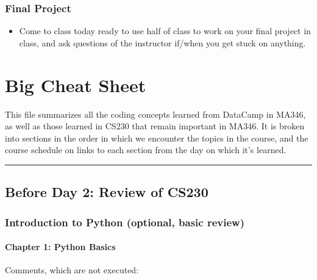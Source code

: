 \documentclass[letterpaper,10pt,english]{jupyterBook}
\begin{document}
\subsection{Final Project}
\label{\detokenize{course-schedule:final-project}}\begin{itemize}
\item {} 
\sphinxAtStartPar
Come to class today ready to use half of class to work on your final project in class, and ask questions of the instructor if/when you get stuck on anything.

\end{itemize}


\chapter{Big Cheat Sheet}
\label{\detokenize{big-cheat-sheet:big-cheat-sheet}}\label{\detokenize{big-cheat-sheet::doc}}
\sphinxAtStartPar
This file summarizes all the coding concepts learned from DataCamp in MA346, as well as those learned in CS230 that remain important in MA346.  It is broken into sections in the order in which we encounter the topics in the course, and the course schedule on {\hyperref[\detokenize{intro::doc}]{}} links to each section from the day on which it’s learned.


\bigskip\hrule\bigskip



\section{Before Day 2: Review of CS230}
\label{\detokenize{big-cheat-sheet:before-day-2-review-of-cs230}}

\subsection{Introduction to Python (optional, basic review)}
\label{\detokenize{big-cheat-sheet:introduction-to-python-optional-basic-review}}

\subsubsection{Chapter 1: Python Basics}
\label{\detokenize{big-cheat-sheet:chapter-1-python-basics}}
\sphinxAtStartPar
Comments, which are not executed:

\begin{sphinxVerbatim}[commandchars=\\\{\}]
\end{sphinxVerbatim}
\end{document}
